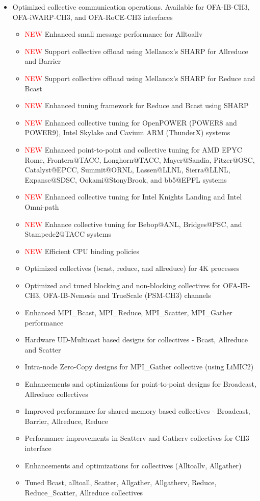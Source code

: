 \begin{itemize}
  
  \item 
    Optimized collective communication
    operations. Available for OFA-IB-CH3, OFA-iWARP-CH3, and  OFA-RoCE-CH3 interfaces
    \begin{itemize}
        \item  \textcolor{red}{NEW}  Enhanced small message performance for Alltoallv
        \item  \textcolor{red}{NEW}  Support collective offload using Mellanox's
            SHARP for Allreduce and Barrier 
        \item \textcolor{red}{NEW}  Support collective offload using Mellanox's
            SHARP for Reduce and Bcast
        \item \textcolor{red}{NEW}  Enhanced tuning framework for Reduce and Bcast using SHARP
        \item  \textcolor{red}{NEW}  Enhanced collective tuning for OpenPOWER
(POWER8 and POWER9), Intel Skylake and Cavium ARM (ThunderX) systems
	\item  \textcolor{red}{NEW} Enhanced point-to-point and collective tuning
        for AMD EPYC Rome, Frontera@TACC, Longhorn@TACC, Mayer@Sandia,
        Pitzer@OSC, Catalyst@EPCC, Summit@ORNL, Lassen@LLNL, Sierra@LLNL,
        Expanse@SDSC, Ookami@StonyBrook, and bb5@EPFL systems
        \item  \textcolor{red}{NEW}  Enhanced collective tuning for Intel Knights Landing and Intel Omni-path
        \item  \textcolor{red}{NEW}  Enhance collective tuning for Bebop@ANL,
            Bridges@PSC, and Stampede2@TACC systems
        \item \textcolor{red}{NEW} Efficient CPU binding policies
      \item  Optimized collectives (bcast, reduce, and allreduce) for 4K processes
      \item  Optimized and tuned blocking and non-blocking collectives for OFA-IB-CH3, OFA-IB-Nemesis and TrueScale (PSM-CH3) channels
      \item  Enhanced MPI\_Bcast, MPI\_Reduce, MPI\_Scatter, MPI\_Gather performance
      \item  Hardware UD-Multicast based designs for collectives - Bcast, Allreduce and Scatter
      \item  Intra-node Zero-Copy designs for MPI\_Gather collective (using LiMIC2)
      \item  Enhancements and optimizations for point-to-point designs for Broadcast, Allreduce collectives
      \item  Improved performance for shared-memory based collectives - Broadcast, Barrier, Allreduce, Reduce
      \item  Performance improvements in Scatterv and Gatherv collectives for CH3 interface
      \item  Enhancements and optimizations for collectives (Alltoallv, Allgather)
      \item  Tuned Bcast, alltoall, Scatter, Allgather, Allgatherv, Reduce, Reduce\_Scatter, Allreduce collectives
    \end{itemize}
  


\end{itemize}
